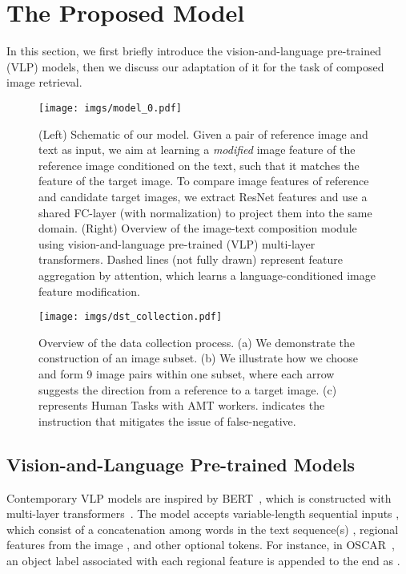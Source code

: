 \documentclass[10pt,twocolumn,letterpaper]{article}
\begin{document}
\section{The Proposed Model}\label{model}
In this section, we first briefly introduce the vision-and-language pre-trained (VLP) models, then we discuss our adaptation of it for the task of composed image retrieval. 

\begin{figure*}[t!]
  \begin{center}
    \texttt{[image: imgs/model\_0.pdf]}
  \end{center}
  \caption{(Left) Schematic of our model. Given a pair of reference image and text as input, we aim at learning a \textit{modified} image feature of the reference image conditioned on the text, such that it matches the feature of the target image. To compare image features of reference and candidate target images, we extract ResNet features and use a shared FC-layer (with normalization) to project them into the same domain. (Right) Overview of the image-text composition module using vision-and-language pre-trained (VLP) multi-layer transformers. Dashed lines (not fully drawn) represent feature aggregation by attention, which learns a language-conditioned image feature modification.}
  \label{fig:model-0}
  \vspace{-1.0em}
\end{figure*}

 
\begin{figure*}[!ht]
  \centering
    \texttt{[image: imgs/dst\_collection.pdf]}
  \caption{Overview of the data collection process. (a) We demonstrate the construction of an image subset. (b) We illustrate how we choose and form 9 image pairs within one subset, where each arrow suggests the direction from a reference to a target image. (c)  represents Human Tasks with AMT workers.  indicates the instruction that mitigates the issue of false-negative.}
  \label{fig:dset_collection_0}
\end{figure*}

\subsection{Vision-and-Language Pre-trained Models}

Contemporary VLP models are inspired by BERT~\cite{devlin2018bert_bert}, which is constructed with multi-layer transformers~\cite{vaswani2017attention_transformer}. 
The model accepts variable-length sequential inputs , which consist of a concatenation among words in the text sequence(s) , regional features from the image , and other optional tokens. For instance, in OSCAR~\cite{oscar}, an object label associated with each regional feature is appended to the end as .
\end{document}
